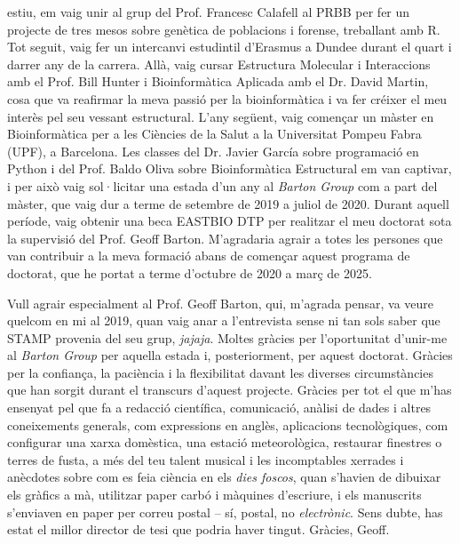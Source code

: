 estiu, em vaig unir al grup del Prof. Francesc Calafell al PRBB per fer un projecte de tres mesos sobre genètica de poblacions i forense, treballant amb R. Tot seguit, vaig fer un intercanvi estudintil d'Erasmus a Dundee durant el quart i darrer any de la carrera. Allà, vaig cursar Estructura Molecular i Interaccions amb el Prof. Bill Hunter i Bioinformàtica Aplicada amb el Dr. David Martin, cosa que va reafirmar la meva passió per la bioinformàtica i va fer créixer el meu interès pel seu vessant estructural. L'any següent, vaig començar un màster en Bioinformàtica per a les Ciències de la Salut a la Universitat Pompeu Fabra (UPF), a Barcelona. Les classes del Dr. Javier García sobre programació en Python i del Prof. Baldo Oliva sobre Bioinformàtica Estructural em van captivar, i per això vaig sol·licitar una estada d'un any al \textit{Barton Group} com a part del màster, que vaig dur a terme de setembre de 2019 a juliol de 2020. Durant aquell període, vaig obtenir una beca EASTBIO DTP per realitzar el meu doctorat sota la supervisió del Prof. Geoff Barton. M'agradaria agrair a totes les persones que van contribuir a la meva formació abans de començar aquest programa de doctorat, que he portat a terme d'octubre de 2020 a març de 2025.

Vull agrair especialment al Prof. Geoff Barton, qui, m'agrada pensar, va veure quelcom en mi al 2019, quan vaig anar a l'entrevista sense ni tan sols saber que STAMP provenia del seu grup, \textit{jajaja}. Moltes gràcies per l'oportunitat d'unir-me al \textit{Barton Group} per aquella estada i, posteriorment, per aquest doctorat. Gràcies per la confiança, la paciència i la flexibilitat davant les diverses circumstàncies que han sorgit durant el transcurs d'aquest projecte. Gràcies per tot el que m'has ensenyat pel que fa a redacció científica, comunicació, anàlisi de dades i altres coneixements generals, com expressions en anglès, aplicacions tecnològiques, com configurar una xarxa domèstica, una estació meteorològica, restaurar finestres o terres de fusta, a més del teu talent musical i les incomptables xerrades i anècdotes sobre com es feia ciència en els \textit{dies foscos}, quan s'havien de dibuixar els gràfics a mà, utilitzar paper carbó i màquines d'escriure, i els manuscrits s'enviaven en paper per correu postal -- sí, postal, no \textit{electrònic}. Sens dubte, has estat el millor director de tesi que podria haver tingut. Gràcies, Geoff.

